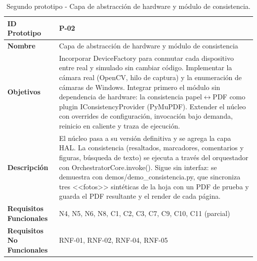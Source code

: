\begin{table}[H]
\centering
\caption{Segundo prototipo - Capa de abstracción de hardware y módulo de consistencia.}
\label{tab:prototipo-p02}
\small
\begin{tabularx}{\textwidth}{>{\bfseries}l X}
\toprule
ID Prototipo & P-02 \\ \midrule
Nombre & Capa de abstracción de hardware y módulo de consistencia \\ \midrule
Objetivos & Incorporar DeviceFactory para conmutar cada dispositivo entre real y simulado sin cambiar código. \newline Implementar la cámara real (OpenCV, hilo de captura) y la enumeración de cámaras de Windows. \newline Integrar primero el módulo sin dependencia de hardware: la consistencia papel$\leftrightarrow$PDF como plugin IConsistencyProvider (PyMuPDF). \newline Extender el núcleo con overrides de configuración, invocación bajo demanda, reinicio en caliente y traza de ejecución. \\ \midrule
Descripción & El núcleo pasa a su versión definitiva y se agrega la capa HAL. La consistencia (resaltados, marcadores, comentarios y figuras, búsqueda de texto) se ejecuta a través del orquestador con OrchestratorCore.invoke(). Sigue sin interfaz: se demuestra con demos/demo\_consistencia.py, que sincroniza tres <<fotos>> sintéticas de la hoja con un PDF de prueba y guarda el PDF resultante y el render de cada página. \\ \midrule
Requisitos Funcionales & N4, N5, N6, N8, C1, C2, C3, C7, C9, C10, C11 (parcial) \\ \midrule
Requisitos No Funcionales & RNF-01, RNF-02, RNF-04, RNF-05 \\ \bottomrule
\end{tabularx}
\end{table}
